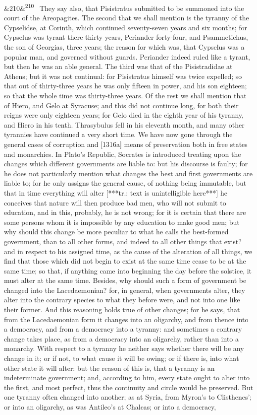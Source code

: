\documentclass[12pt]{article}
\newcommand{\para}[1][]{\par\noindent\ifx&#1&\else\textsuperscript{\footnotesize #1}~\fi}
\begin{document}
\para[210] They say also, that Pisistratus submitted to be summoned into the court of the Areopagites. The second that we shall mention is the tyranny of the Cypselidse, at Corinth, which continued seventy-seven years and six months; for Cypselus was tyrant there thirty years, Periander forty-four, and Psammetichus, the son of Georgias, three years; the reason for which was, that Cypselus was a popular man, and governed without guards. Periander indeed ruled like a tyrant, but then he was an able general. The third was that of the Pisistradidae at Athens; but it was not continual: for Pisistratus himself was twice expelled; so that out of thirty-three years he was only fifteen in power, and his son eighteen; so that the whole time was thirty-three years. Of the rest we shall mention that of Hiero, and Gelo at Syracuse; and this did not continue long, for both their reigns were only eighteen years; for Gelo died in the eighth year of his tyranny, and Hiero in his tenth. Thrasybulus fell in his eleventh month, and many other tyrannies have continued a very short time. We have now gone through the general cases of corruption and [1316a] means of preservation both in free states and monarchies. In Plato's Republic, Socrates is introduced treating upon the changes which different governments are liable to: but his discourse is faulty; for he does not particularly mention what changes the best and first governments are liable to; for he only assigns the general cause, of nothing being immutable, but that in time everything will alter [***tr.: text is unintelligible here***] he conceives that nature will then produce bad men, who will not submit to education, and in this, probably, he is not wrong; for it is certain that there are some persons whom it is impossible by any education to make good men; but why should this change be more peculiar to what he calls the best-formed government, than to all other forms, and indeed to all other things that exist? and in respect to his assigned time, as the cause of the alteration of all things, we find that those which did not begin to exist at the same time cease to be at the same time; so that, if anything came into beginning the day before the solstice, it must alter at the same time. Besides, why should such a form of government be changed into the Lacedaemonian? for, in general, when governments alter, they alter into the contrary species to what they before were, and not into one like their former. And this reasoning holds true of other changes; for he says, that from the Lacedaemonian form it changes into an oligarchy, and from thence into a democracy, and from a democracy into a tyranny: and sometimes a contrary change takes place, as from a democracy into an oligarchy, rather than into a monarchy. With respect to a tyranny he neither says whether there will be any change in it; or if not, to what cause it will be owing; or if there is, into what other state it will alter: but the reason of this is, that a tyranny is an indeterminate government; and, according to him, every state ought to alter into the first, and most perfect, thus the continuity and circle would be preserved. But one tyranny often changed into another; as at Syria, from Myron's to Clisthenes'; or into an oligarchy, as was Antileo's at Chalcas; or into a democracy, 
\end{document}
